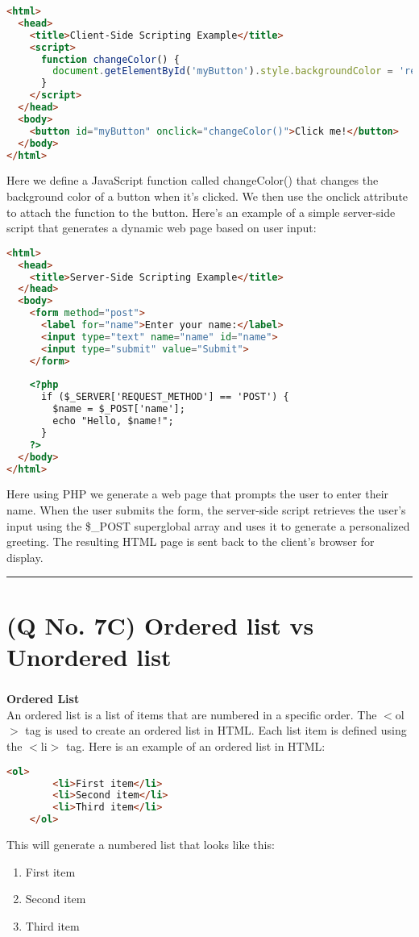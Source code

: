 \documentclass[11pt]{article}
\begin{document}
\begin{lstlisting}[language=html]
<html>
  <head>
    <title>Client-Side Scripting Example</title>
    <script>
      function changeColor() {
        document.getElementById('myButton').style.backgroundColor = 'red';
      }
    </script>
  </head>
  <body>
    <button id="myButton" onclick="changeColor()">Click me!</button>
  </body>
</html>
\end{lstlisting}
Here we define a JavaScript function called changeColor() that changes the background color of a button when it's clicked. We then use the onclick attribute to attach the function to the button.
Here's an example of a simple server-side script that generates a dynamic web page based on user input:
\begin{lstlisting}[language=html]
<html>
  <head>
    <title>Server-Side Scripting Example</title>
  </head>
  <body>
    <form method="post">
      <label for="name">Enter your name:</label>
      <input type="text" name="name" id="name">
      <input type="submit" value="Submit">
    </form>
    
    <?php
      if ($_SERVER['REQUEST_METHOD'] == 'POST') {
        $name = $_POST['name'];
        echo "Hello, $name!";
      }
    ?>
  </body>
</html>

\end{lstlisting}
Here using PHP we generate a web page that prompts the user to enter their name. When the user submits the form, the server-side script retrieves the user's input using the \$\_POST superglobal array and uses it to generate a personalized greeting. The resulting HTML page is sent back to the client's browser for display.


\noindent\rule{\linewidth}{0.4pt}
\section{(Q No. 7C) Ordered list vs Unordered list}
\subparagraph{}
\textbf{Ordered List}\\
An ordered list is a list of items that are numbered in a specific order. The $<$ol$>$ tag is used to create an ordered list in HTML. Each list item is defined using the $<$li$>$ tag. Here is an example of an ordered list in HTML:
\begin{lstlisting}[language=html]
    <ol>
        <li>First item</li>
        <li>Second item</li>
        <li>Third item</li>
    </ol>
\end{lstlisting}
This will generate a numbered list that looks like this:
    \begin{enumerate}
        \item First item
        \item Second item
        \item Third item
    \end{enumerate}
\end{document}
